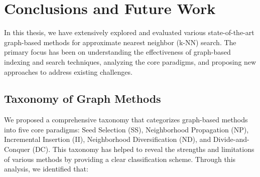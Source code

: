 \chapter{Conclusions and Future Work}
\label{ch:discussion_conclusion}

In this thesis, we have extensively explored and evaluated various state-of-the-art graph-based methods for approximate nearest neighbor (k-NN) search. The primary focus has been on understanding the effectiveness of graph-based indexing and search techniques, analyzing the core paradigms, and proposing new approaches to address existing challenges.

\section{Taxonomy of Graph Methods}
We proposed a comprehensive taxonomy that categorizes graph-based methods into five core paradigms: Seed Selection (SS), Neighborhood Propagation (NP), Incremental Insertion (II), Neighborhood Diversification (ND), and Divide-and-Conquer (DC). This taxonomy has helped to reveal the strengths and limitations of various methods by providing a clear classification scheme. Through this analysis, we identified that:
